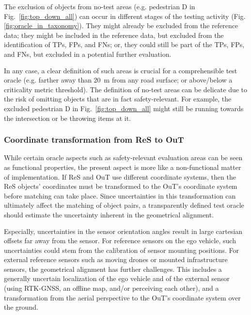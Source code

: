 \documentclass[conference]{IEEEtran}
\begin{document}
The exclusion of objects from no-test areas (e.g. pedestrian D in Fig.~\ref{fig:top_down_all}) can occur in different stages of the testing activity (Fig. \ref{fig:oracle_in_taxonomy}). 
They might already be excluded from the reference data; they might be included in the reference data, but excluded from the identification of TPs, FPs, and FNs; or, they could still be part of the TPs, FPs, and FNs, but excluded in a potential further evaluation.

In any case, a clear definition of such areas is crucial for a comprehensible test oracle (e.g. farther away than \SI{20}{\meter} from any road surface; or above/below a criticality metric threshold).
The definition of no-test areas can be delicate due to the risk of omitting objects that are in fact safety-relevant. 
For example, the excluded pedestrian D in Fig.~\ref{fig:top_down_all} might still be running towards the intersection or be throwing items at it.

\subsubsection{Coordinate transformation from ReS to OuT}
\label{sec:basic_spatial_alignment}

While certain oracle aspects such as safety-relevant evaluation areas can be seen as functional properties, the present aspect is more like a non-functional matter of implementation.
If ReS and OuT use different coordinate systems, then the ReS objects' coordinates must be transformed to the OuT's coordinate system before matching can take place.
Since uncertainties in this transformation can ultimately affect the matching of object pairs, a transparently defined test oracle should estimate the uncertainty inherent in the geometrical alignment. 


 
Especially, uncertainties in the sensor orientation angles result in large cartesian offsets far away from the sensor.
For reference sensors on the ego vehicle, such uncertainties could stem from the calibration of sensor mounting positions. 
For external reference sensors such as moving drones or mounted infrastructure sensors, the geometrical alignment has further challenges. %
This includes a generally uncertain localization of the ego vehicle and of the external sensor (using RTK-GNSS, an offline map, and/or perceiving each other), and a transformation from the aerial perspective to the OuT's coordinate system over the ground. 
\end{document}
